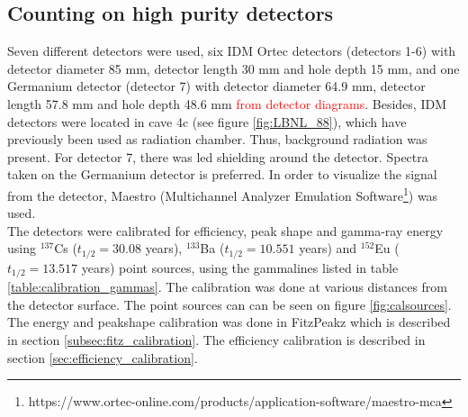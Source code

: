 \subsection{Counting on high purity detectors}

\noindent 
Seven different detectors were used, six IDM Ortec detectors (detectors 1-6) with detector diameter 85 mm, detector length 30 mm and hole depth 15 mm, and one Germanium detector (detector 7) with detector diameter 64.9 mm, detector length 57.8 mm and hole depth 48.6 mm \textcolor{red}{from detector diagrams}. Besides, IDM detectors were located in cave 4c (see figure \ref{fig:LBNL_88}), which have previously been used as radiation chamber. Thus, background radiation was present. For detector 7, there was led shielding around the detector. Spectra taken on the Germanium detector is preferred. In order to visualize the signal from the detector, Maestro  (Multichannel Analyzer Emulation Software\footnote{https://www.ortec-online.com/products/application-software/maestro-mca}) was used. \\ 

\noindent 
The detectors were calibrated for efficiency, peak shape and gamma-ray energy using $^{137}$Cs ($t_{1/2}=30.08$ years\cite{Browne2007}), $^{133}$Ba ($t_{1/2}=10.551$ years\cite{Khazov2011}) and $^{152}$Eu ($t_{1/2}=13.517$ years\cite{Martin2013}) point sources, using the gammalines listed in table \ref{table:calibration_gammas}. The calibration was done at various distances from the detector surface. The point sources can can be seen on figure \ref{fig:calsources}. The energy and peakshape calibration was done in FitzPeakz which is described in section \ref{subsec:fitz_calibration}. The efficiency calibration is described in section \ref{sec:efficiency_calibration}. \\ 

